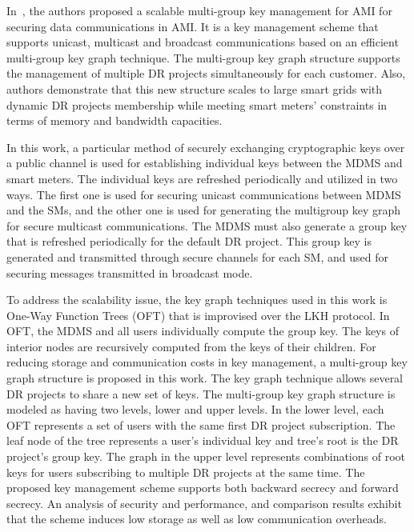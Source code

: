 In~\cite{Benmalek15}, the authors proposed a scalable multi-group key management for AMI for securing data communications in AMI. It is a key management scheme that supports unicast, multicast and broadcast communications based on an efficient multi-group key graph technique. The multi-group key graph structure supports the management of multiple DR projects simultaneously for each customer. Also, authors demonstrate that this new structure scales to large smart grids with dynamic DR projects membership while meeting smart meters’ constraints in terms of memory and bandwidth capacities. 
\par In this work, a particular method of securely exchanging cryptographic keys over a public channel is used for establishing individual keys between the MDMS and smart meters. The individual keys are refreshed periodically and utilized in two ways. The first one is used for securing unicast communications between MDMS and the SMs, and the other one is used for generating the multigroup key graph for secure multicast communications. The MDMS must also generate a group key that is refreshed periodically for the default DR project. This group key is generated and transmitted through secure channels for each SM, and used for securing messages transmitted in broadcast mode. 
\par To address the scalability issue, the key graph techniques used in this work is One-Way Function Trees (OFT) that is improvised over the LKH protocol. In OFT, the MDMS and all users individually compute the group key. The keys of interior nodes are recursively computed from the keys of their children. For reducing storage and communication costs in key management, a multi-group key graph structure is proposed in this work. The key graph technique allows several DR projects to share a new set of keys. The multi-group key graph structure is modeled as having two levels, lower and upper levels. In the lower level, each OFT represents a set of users with the same first DR project subscription. The leaf node of the tree represents a user’s individual key and tree’s root is the DR project’s group key. The graph in the upper level represents combinations of root keys for users subscribing to multiple DR projects at the same time. The proposed key management scheme supports both backward secrecy and forward secrecy. An analysis of security and performance, and comparison results exhibit that the scheme induces low storage as well as low communication overheads.
